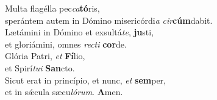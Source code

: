 \oddverse Multa flagélla pec\textit{ca}\textbf{tó}ris,~\*\\
\oddverse sperántem autem in Dómino misericórdi\textit{a} \textit{cir}\textbf{cúm}dabit.\\
\evenverse Lætámini in Dómino et exsultá\textit{te}, \textbf{ju}sti,~\*\\
\evenverse et gloriámini, omnes \textit{re}\textit{cti} \textbf{cor}de.\\
\oddverse Glória Patri, \textit{et} \textbf{Fí}lio,~\*\\
\oddverse et Spirí\textit{tu}\textit{i} \textbf{San}cto.\\
\evenverse Sicut erat in princípio, et nunc, \textit{et} \textbf{sem}per,~\*\\
\evenverse et in sǽcula sæcu\textit{ló}\textit{rum}. \textbf{A}men.\\
